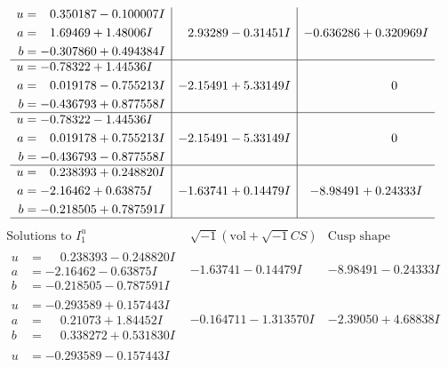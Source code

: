 \documentclass[1p]{elsarticle_modified}
\theoremstyle{definition}
\newcommand{\I}{\sqrt{-1}}
\begin{document}
$$\begin{array}{c|c|c}
\begin{aligned}
u &= \phantom{-}0.350187 - 0.100007 I \\
a &= \phantom{-}1.69469 + 1.48006 I \\
b &= -0.307860 + 0.494384 I\end{aligned}
 & \phantom{-}2.93289 - 0.31451 I & -0.636286 + 0.320969 I \\ \hline\begin{aligned}
u &= -0.78322 + 1.44536 I \\
a &= \phantom{-}0.019178 - 0.755213 I \\
b &= -0.436793 + 0.877558 I\end{aligned}
 & -2.15491 + 5.33149 I & \phantom{-0.000000 } 0 \\ \hline\begin{aligned}
u &= -0.78322 - 1.44536 I \\
a &= \phantom{-}0.019178 + 0.755213 I \\
b &= -0.436793 - 0.877558 I\end{aligned}
 & -2.15491 - 5.33149 I & \phantom{-0.000000 } 0 \\ \hline\begin{aligned}
u &= \phantom{-}0.238393 + 0.248820 I \\
a &= -2.16462 + 0.63875 I \\
b &= -0.218505 + 0.787591 I\end{aligned}
 & -1.63741 + 0.14479 I & -8.98491 + 0.24333 I\\
 \hline 
 \end{array}$$\newpage$$\begin{array}{c|c|c}  
\text{Solutions to }I^u_{1}& \I (\text{vol} + \sqrt{-1}CS) & \text{Cusp shape}\\
 \hline 
\begin{aligned}
u &= \phantom{-}0.238393 - 0.248820 I \\
a &= -2.16462 - 0.63875 I \\
b &= -0.218505 - 0.787591 I\end{aligned}
 & -1.63741 - 0.14479 I & -8.98491 - 0.24333 I \\ \hline\begin{aligned}
u &= -0.293589 + 0.157443 I \\
a &= \phantom{-}0.21073 + 1.84452 I \\
b &= \phantom{-}0.338272 + 0.531830 I\end{aligned}
 & -0.164711 - 1.313570 I & -2.39050 + 4.68838 I \\ \hline\begin{aligned}
u &= -0.293589 - 0.157443 I \\

\end{aligned}
\end{array}$$
\end{document}
